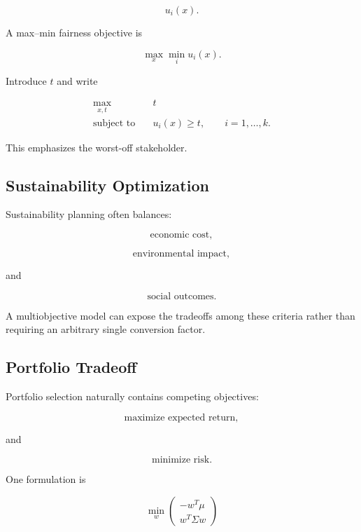 \[
u_i(x).
\]

A max--min fairness objective is

\[
\boxed{
\max_x
\min_i
u_i(x).
}
\]

Introduce \(t\) and write

\[
\boxed{
\begin{aligned}
\max_{x,t}
\quad&
t
\\
\text{subject to}
\quad&
u_i(x)\geq t,
\qquad
i=1,\ldots,k.
\end{aligned}
}
\]

This emphasizes the worst-off stakeholder.

\subsection{Sustainability Optimization}
\label{subsec:sustainability-multiobjective}

Sustainability planning often balances:

\[
\boxed{
\text{economic cost},
}
\]

\[
\boxed{
\text{environmental impact},
}
\]

and

\[
\boxed{
\text{social outcomes}.
}
\]

A multiobjective model can expose the tradeoffs among these criteria rather
than requiring an arbitrary single conversion factor.

\subsection{Portfolio Tradeoff}
\label{subsec:portfolio-multiobjective}

Portfolio selection naturally contains competing objectives:

\[
\boxed{
\text{maximize expected return},
}
\]

and

\[
\boxed{
\text{minimize risk}.
}
\]

One formulation is

\[
\boxed{
\min_w
\begin{pmatrix}
-w^T\mu\\
w^T\Sigma w
\end{pmatrix}
}
\]

